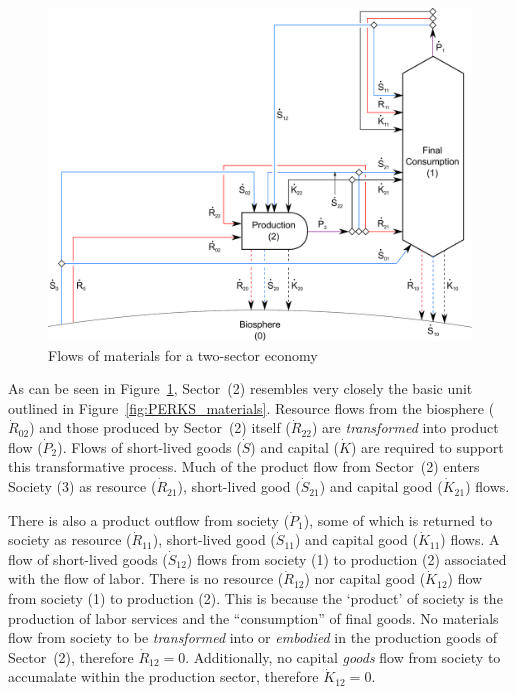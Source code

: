 \begin{figure}[!ht]
\centering
\includegraphics[width=0.8\linewidth]{Part_1/Chapter_Materials/images/2_sector_materials.pdf}
\caption[Flows of materials for a two-sector economy]{Flows of materials for a two-sector economy}
\label{fig:B_materials}
\end{figure}

As can be seen in Figure~\ref{fig:B_materials}, 
Sector~(2) resembles very closely the basic unit
outlined in Figure~\ref{fig:PERKS_materials}. 
Resource flows from the biosphere ($\dot{R}_{02}$)
and those produced by Sector~(2) itself ($\dot{R}_{22}$) 
are \emph{transformed} into product flow
($\dot{P}_{2}$). 
Flows of short-lived goods ($\dot{S}$) 
and capital ($\dot{K}$) are required to
support this transformative process. 
Much of the product flow from Sector~(2) 
enters Society (3) as resource ($\dot{R}_{21}$), 
short-lived good ($\dot{S}_{21}$) 
and capital good ($\dot{K}_{21}$)
flows.

There is also a product outflow 
from society ($\dot{P}_{1}$), 
some of which is returned to society
as resource ($\dot{R}_{11}$), 
short-lived good ($\dot{S}_{11}$) 
and capital good ($\dot{K}_{11}$) flows. 
A flow of short-lived goods ($\dot{S}_{12}$)
flows from society (1) to production (2) 
associated with the flow of labor. 
There is no resource ($\dot{R}_{12}$) nor 
capital good ($\dot{K}_{12}$) flow from 
society (1) to production (2). 
This is because the `product' of society
is the production of labor services 
and the ``consumption'' of final goods. 
No materials flow from society to be 
\emph{transformed} into or \emph{embodied} 
in the production goods of Sector~(2), 
therefore $\dot{R}_{12} = 0$. 
Additionally, no capital \emph{goods} flow 
from society to accumalate
within the production sector, 
therefore $\dot{K}_{12} = 0$.

